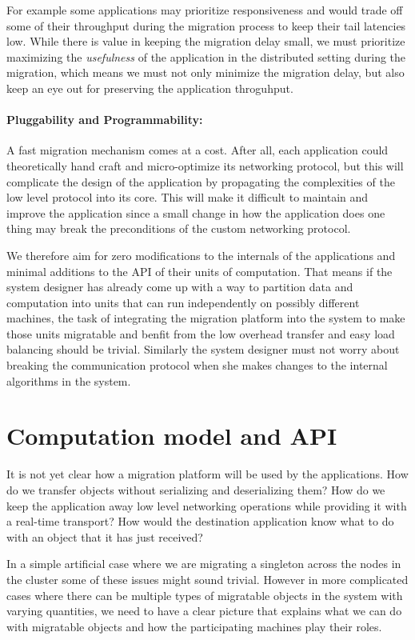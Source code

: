 For example some applications may prioritize responsiveness and
    would trade off
    some of their throughput during the migration process to keep their
    tail latencies low. While there is value in keeping the migration delay
    small, we must
    prioritize maximizing the \emph{usefulness} of the application in
    the distributed setting during the migration, which means we must not only
    minimize the migration delay, but also keep an eye out for preserving
    the application throguhput.

\paragraph{Pluggability and Programmability:}
A fast migration mechanism comes at a cost. After all, each application
could theoretically hand craft and micro-optimize its networking protocol,
but this will complicate the design of the application by propagating
the complexities of the low level protocol into its core.
This will make it difficult to maintain and improve the
application since a small change in how the application does one thing
may break the preconditions of the custom networking protocol.

We therefore aim for zero modifications to the
internals of the applications and minimal additions to the API of their
units of computation. That means if the system designer has already come up
with a way to partition data and computation into units that can run
independently on possibly different machines, the task of integrating the
migration platform into the system to make those units migratable and benfit
from the low overhead transfer and easy load balancing should be trivial.
Similarly the system designer must not worry about breaking the communication
protocol when she makes changes to the internal algorithms in the system.

\section{Computation model and API}
\label{sec:api}
It is not yet clear how a migration platform will be used by the
applications. How do we transfer objects without serializing and deserializing
them? How do we keep the application away low level networking operations while
providing it with a real-time transport? How would the destination application
know what to do with an object that it has just received?

In a simple artificial case where we are migrating a singleton across
the nodes in the cluster some of these issues might sound trivial.
However in more complicated
cases where there can be multiple types of migratable objects in the
system with varying quantities, we need to have a clear picture that
explains what we can do with migratable objects and how the participating
machines play their roles.

